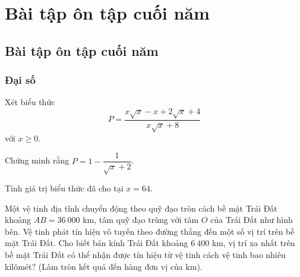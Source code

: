 %

\section*{Bài tập ôn tập cuối năm}

\begin{exercises}
    \subsection{Bài tập ôn tập cuối năm}
    \renewcommand{\questionprefix}{}

    \subsubsection*{Đại số}

    \begin{questions}[series=SGK]
        \item Xét biểu thức
        \[
            P=\dfrac{x\sqrt{x}-x+2\sqrt{x}+4}{x\sqrt{x}+8}
        \]
        với $x\ge 0$.
        \begin{questions}
            \item Chứng minh rằng $P=1-\dfrac{1}{\sqrt{x}+2}$.
            \answerline
            \answerline
            \item Tính giá trị biểu thức đã cho tại $x=64$.
            \answerline
        \end{questions}

        \item Một vệ tinh địa tĩnh chuyển động theo quỹ đạo tròn cách bề mặt Trái Đất khoảng $AB=36\ 000$ km, tâm quỹ đạo trùng với tâm $O$ của Trái Đất như hình bên. Vệ tinh phát tín hiệu vô tuyến theo đường thẳng đến một số vị trí trên bề mặt Trái Đất. Cho biết bán kính Trái Đất khoảng $6\ 400$ km, vị trí xa nhất trên bề mặt Trái Đất có thể nhận được tín hiệu từ vệ tinh cách vệ tinh bao nhiêu kilômét? (Làm tròn kết quả đến hàng đơn vị của km).


\end{questions}
\end{exercises}
